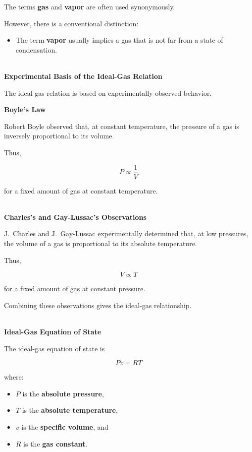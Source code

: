 \documentclass[12pt]{article}
\begin{document}
The terms \textbf{gas} and \textbf{vapor} are often used synonymously.

However, there is a conventional distinction:
\begin{itemize}
        \item The term \textbf{vapor} usually implies a gas that is not far from a state of condensation.
\end{itemize}

\textbf{\\ Experimental Basis of the Ideal-Gas Relation}

The ideal-gas relation is based on experimentally observed behavior.

\textbf{Boyle's Law}

Robert Boyle observed that, at constant temperature, the pressure of a gas is inversely proportional to its volume.

Thus,

\begin{equation*}
P\propto\frac{1}{V}
\end{equation*}

for a fixed amount of gas at constant temperature.

\textbf{\\ Charles's and Gay-Lussac's Observations}

J.~Charles and J.~Gay-Lussac experimentally determined that, at low pressures, the volume of a gas is proportional to its absolute temperature.

Thus,

\begin{equation*}
V\propto T
\end{equation*}

for a fixed amount of gas at constant pressure.

Combining these observations gives the ideal-gas relationship.

\textbf{\\ Ideal-Gas Equation of State}

The ideal-gas equation of state is

\begin{equation*}
\boxed{Pv=RT}
\end{equation*}

where:
\begin{itemize}
    \item $P$ is the \textbf{absolute pressure},
    \item $T$ is the \textbf{absolute temperature},
    \item $v$ is the \textbf{specific volume}, and
    \item $R$ is the \textbf{gas constant}.
\end{itemize}
\end{document}
